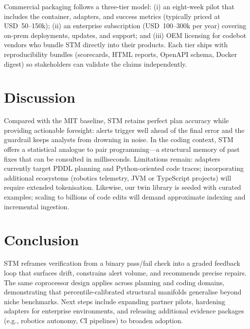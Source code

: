 \documentclass[11pt]{article}
\begin{document}
Commercial packaging follows a three-tier model: (i) an eight-week pilot that includes the container, adapters, and success metrics (typically priced at USD~50--150k); (ii) an enterprise subscription (USD~100--300k per year) covering on-prem deployments, updates, and support; and (iii) OEM licensing for codebot vendors who bundle STM directly into their products. Each tier ships with reproducibility bundles (scorecards, HTML reports, OpenAPI schema, Docker digest) so stakeholders can validate the claims independently.

\section{Discussion}
Compared with the MIT baseline, STM retains perfect plan accuracy while providing actionable foresight: alerts trigger well ahead of the final error and the guardrail keeps analysts from drowning in noise. In the coding context, STM offers a statistical analogue to pair programming---a structural memory of past fixes that can be consulted in milliseconds. Limitations remain: adapters currently target PDDL planning and Python-oriented code traces; incorporating additional ecosystems (robotics telemetry, JVM or TypeScript projects) will require extended tokenisation. Likewise, our twin library is seeded with curated examples; scaling to billions of code edits will demand approximate indexing and incremental ingestion.

\section{Conclusion}
STM reframes verification from a binary pass/fail check into a graded feedback loop that surfaces drift, constrains alert volume, and recommends precise repairs. The same coprocessor design applies across planning and coding domains, demonstrating that percentile-calibrated structural manifolds generalise beyond niche benchmarks. Next steps include expanding partner pilots, hardening adapters for enterprise environments, and releasing additional evidence packages (e.g., robotics autonomy, CI pipelines) to broaden adoption.

\newpage
\appendix
\end{document}
